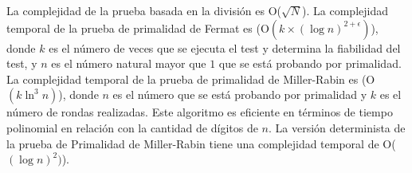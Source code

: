 La complejidad de la prueba basada en la división es O($\sqrt{N}$). La complejidad temporal de la prueba de primalidad de Fermat es (O$(k \times (\log n)^{2+\epsilon})$), donde $k$ es el número de veces que se ejecuta el test y determina la fiabilidad del test, y $n$ es el número natural mayor que $1$ que se está probando por primalidad. La complejidad temporal de la prueba de primalidad de Miller-Rabin es (O$(k \ln^{3} n)$), donde $n$ es el número que se está probando por primalidad y $k$ es el número de rondas realizadas. Este algoritmo es eficiente en términos de tiempo polinomial en relación con la cantidad de dígitos de $n$. La versión determinista de la prueba de Primalidad de Miller-Rabin tiene una complejidad temporal de O($(\log n)^2)$). 